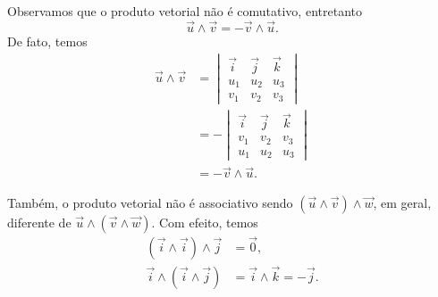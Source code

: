 Observamos que o produto vetorial não é comutativo, entretanto
\begin{equation}
  \vec{u}\land\vec{v} = -\vec{v}\land\vec{u}.
\end{equation}
De fato, temos
\begin{align}
  \vec{u}\land\vec{v} &= \begin{vmatrix}
                         \vec{i} & \vec{j} & \vec{k} \\
                         u_1 & u_2 & u_3 \\
                         v_1 & v_2 & v_3                                    
                       \end{vmatrix}\\
                      &= -\begin{vmatrix}
                         \vec{i} & \vec{j} & \vec{k} \\
                         v_1 & v_2 & v_3 \\
                         u_1 & u_2 & u_3                                    
                       \end{vmatrix}\\
                      &= -\vec{v}\land\vec{u}.
\end{align}

Também, o produto vetorial não é associativo sendo $(\vec{u}\land\vec{v})\land\vec{w}$, em geral, diferente de $\vec{u}\land(\vec{v}\land\vec{w})$. Com efeito, temos
\begin{align}
  (\vec{i}\land\vec{i})\land\vec{j} &= \vec{0},\\
  \vec{i}\land(\vec{i}\land\vec{j}) &= \vec{i}\land\vec{k} = -\vec{j}.
\end{align}

